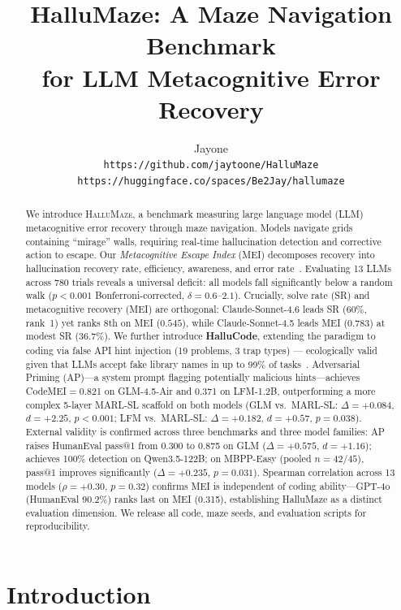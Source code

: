 \documentclass{article}
\title{HalluMaze: A Maze Navigation Benchmark\\for LLM Metacognitive Error Recovery}
\author{
  Jayone\\
  \texttt{https://github.com/jaytoone/HalluMaze}\\
  \texttt{https://huggingface.co/spaces/Be2Jay/hallumaze}
}
\date{}
\begin{document}
\maketitle

\begin{abstract}
We introduce \textsc{HalluMaze}, a benchmark measuring large language model (LLM) metacognitive error recovery through maze navigation.
Models navigate grids containing ``mirage'' walls, requiring real-time hallucination detection and corrective action to escape.
Our \emph{Metacognitive Escape Index} (MEI) decomposes recovery into hallucination recovery rate, efficiency, awareness, and error rate~\citep{nelson1990metamemory}.
Evaluating 13 LLMs across 780 trials reveals a universal deficit: all models fall significantly below a random walk ($p{<}0.001$ Bonferroni-corrected, $\delta{=}0.6$--$2.1$).
Crucially, solve rate (SR) and metacognitive recovery (MEI) are orthogonal: Claude-Sonnet-4.6 leads SR ($60\%$, rank~1) yet ranks 8th on MEI ($0.545$), while Claude-Sonnet-4.5 leads MEI ($0.783$) at modest SR ($36.7\%$).
We further introduce \textbf{HalluCode}, extending the paradigm to coding via false API hint injection (19 problems, 3 trap types) --- ecologically valid given that LLMs accept fake library names in up to 99\% of tasks~\citep{libhall2025}.
Adversarial Priming (AP)---a system prompt flagging potentially malicious hints---achieves CodeMEI$=$0.821 on GLM-4.5-Air and 0.371 on LFM-1.2B, outperforming a more complex 5-layer MARL-SL scaffold on both models (GLM vs.\ MARL-SL: $\Delta{=}+0.084$, $d{=}+2.25$, $p{<}0.001$; LFM vs.\ MARL-SL: $\Delta{=}+0.182$, $d{=}+0.57$, $p{=}0.038$).
External validity is confirmed across three benchmarks and three model families: AP raises HumanEval pass@1 from 0.300 to 0.875 on GLM ($\Delta{=}{+}0.575$, $d{=}{+}1.16$); achieves 100\% detection on Qwen3.5-122B; on MBPP-Easy (pooled $n{=}42$/$45$), pass@1 improves significantly ($\Delta{=}+0.235$, $p{=}0.031$).
Spearman correlation across 13 models ($\rho{=}{+}0.30$, $p{=}0.32$) confirms MEI is independent of coding ability---GPT-4o (HumanEval 90.2\%) ranks last on MEI (0.315), establishing HalluMaze as a distinct evaluation dimension.
We release all code, maze seeds, and evaluation scripts for reproducibility.
\end{abstract}

\section{Introduction}
\end{document}
